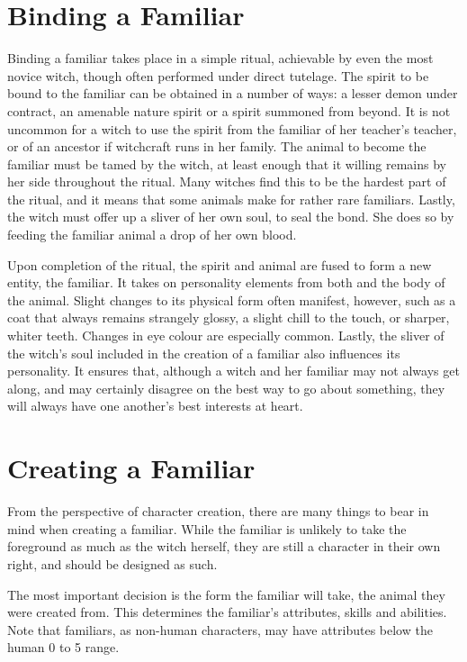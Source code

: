 \section{Binding a Familiar}

Binding a familiar takes place in a simple ritual, achievable by even the most novice witch, though often performed under direct tutelage.
The spirit to be bound to the familiar can be obtained in a number of ways: a lesser demon under contract, an amenable nature spirit or a spirit summoned from beyond.
It is not uncommon for a witch to use the spirit from the familiar of her teacher's teacher, or of an ancestor if witchcraft runs in her family.
The animal to become the familiar must be tamed by the witch, at least enough that it willing remains by her side throughout the ritual.
Many witches find this to be the hardest part of the ritual, and it means that some animals make for rather rare familiars.
Lastly, the witch must offer up a sliver of her own soul, to seal the bond.
She does so by feeding the familiar animal a drop of her own blood.

Upon completion of the ritual, the spirit and animal are fused to form a new entity, the familiar.
It takes on personality elements from both and the body of the animal.
Slight changes to its physical form often manifest, however, such as a coat that always remains strangely glossy, a slight chill to the touch, or sharper, whiter teeth.
Changes in eye colour are especially common.
Lastly, the sliver of the witch's soul included in the creation of a familiar also influences its personality.
It ensures that, although a witch and her familiar may not always get along, and may certainly disagree on the best way to go about something, they will always have one another's best interests at heart.

\section{Creating a Familiar}

From the perspective of character creation, there are many things to bear in mind when creating a familiar.
While the familiar is unlikely to take the foreground as much as the witch herself, they are still a character in their own right, and should be designed as such.

The most important decision is the form the familiar will take, the animal they were created from.
This determines the familiar's attributes, skills and abilities.
Note that familiars, as non-human characters, may have attributes below the human 0 to 5 range.

